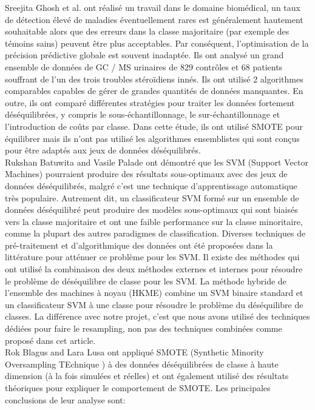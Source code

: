 \documentclass[12pt, french]{report}
\begin{document}
Sreejita Ghosh et al.  \cite{key31} ont réalisé un travail dans le domaine biomédical, un taux de détection élevé de maladies éventuellement rares est généralement hautement souhaitable alors que des erreurs dans la classe majoritaire (par exemple des témoins sains) peuvent être plus acceptables. Par conséquent, l'optimisation de la précision prédictive globale est souvent inadaptée. Ils ont analysé un grand ensemble de données de GC / MS urinaires de 829 contrôles et 68 patients souffrant de l'un des trois troubles stéroïdiens innés. Ils ont utilisé 2 algorithmes comparables capables de gérer de grandes quantités de données manquantes. En outre, ils ont comparé différentes stratégies pour traiter les données fortement déséquilibrées, y compris le sous-échantillonnage, le sur-échantillonnage et l'introduction de coûts par classe. Dans cette étude, ils ont utilisé SMOTE pour équilibrer mais ils n'ont pas utilisé les algorithmes ensemblistes qui sont conçus pour être adaptés aux jeux de données déséquilibrés. \\

Rukshan Batuwita and Vasile Palade \cite{key32} ont démontré que les SVM (Support Vector Machines) pourraient produire des résultats sous-optimaux avec des jeux de données déséquilibrés, malgré c'est une technique d'apprentissage automatique très populaire. Autrement dit, un classificateur SVM formé sur un ensemble de données déséquilibré peut produire des modèles sous-optimaux qui sont biaisés vers la classe majoritaire et ont une faible performance sur la classe minoritaire, comme la plupart des autres paradigmes de classification. Diverses techniques de pré-traitement et d'algorithmique des données ont été proposées dans la littérature pour atténuer ce problème pour les SVM. Il existe des méthodes qui ont utilisé la combinaison des deux méthodes externes et internes pour résoudre le problème de déséquilibre de classe pour les SVM. La méthode hybride de l'ensemble des machines à noyau (HKME) combine un SVM binaire standard et un classificateur SVM à une classe pour résoudre le problème du déséquilibre de classes. La différence avec notre projet, c'est que nous avons utilisé des techniques dédiées pour faire le resampling, non pas des techniques combinées comme proposé dans cet article.\\

Rok Blagus and Lara Lusa \cite{key33}  ont appliqué SMOTE (Synthetic Minority Oversampling TEchnique ) à des données déséquilibrées de classe à haute dimension (à la fois simulées et réelles) et ont également utilisé des résultats théoriques pour expliquer le comportement de SMOTE. Les principales conclusions de leur analyse sont:
\end{document}

